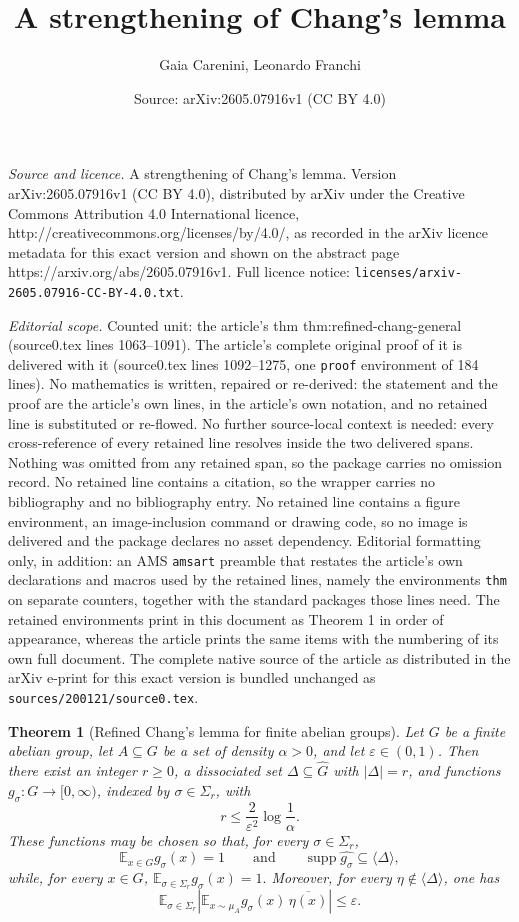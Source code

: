 \documentclass[10pt,a4paper]{amsart}
\title{A strengthening of Chang's lemma}
\author{Gaia Carenini, Leonardo Franchi}
\date{Source: arXiv:2605.07916v1 (CC BY 4.0)}
\newtheorem{thm}{Theorem}
\begin{document}
\maketitle

\noindent\emph{Source and licence.} A strengthening of Chang's lemma. Version arXiv:2605.07916v1 (CC BY 4.0), distributed by arXiv under the Creative Commons Attribution 4.0 International licence, http://creativecommons.org/licenses/by/4.0/, as recorded in the arXiv licence metadata for this exact version and shown on the abstract page https://arxiv.org/abs/2605.07916v1. Full licence notice: \texttt{licenses/arxiv-2605.07916-CC-BY-4.0.txt}.\par\smallskip

\noindent\textit{Editorial scope.} Counted unit: the article's thm thm:refined-chang-general (source0.tex lines 1063--1091). The article's complete original proof of it is delivered with it (source0.tex lines 1092--1275, one \texttt{proof} environment of 184 lines). No mathematics is written, repaired or re-derived: the statement and the proof are the article's own lines, in the article's own notation, and no retained line is substituted or re-flowed.  No further source-local context is needed: every cross-reference of every retained line resolves inside the two delivered spans.  Nothing was omitted from any retained span, so the package carries no omission record.  No retained line contains a citation, so the wrapper carries no bibliography and no bibliography entry.  No retained line contains a figure environment, an image-inclusion command or drawing code, so no image is delivered and the package declares no asset dependency.  Editorial formatting only, in addition: an AMS \texttt{amsart} preamble that restates the article's own declarations and macros used by the retained lines, namely the environments \texttt{thm} on separate counters, together with the standard packages those lines need.  The retained environments print in this document as Theorem 1 in order of appearance, whereas the article prints the same items with the numbering of its own full document.  The complete native source of the article as distributed in the arXiv e-print for this exact version is bundled unchanged as \texttt{sources/200121/source0.tex}.
\begin{thm}[Refined Chang's lemma for finite abelian groups]
\label{thm:refined-chang-general}
Let $G$ be a finite abelian group, let $A\subseteq G$ be a set of density
$\alpha>0$, and let $\varepsilon\in(0,1)$. Then there exist an integer
$r\ge 0$, a dissociated set $\Delta\subseteq \widehat G$ with $|\Delta|=r$,
and functions $g_\sigma:G\to[0,\infty)$, indexed by $\sigma\in\Sigma_r$,
with
$$
r\le \frac{2}{\varepsilon^2}\log\frac1\alpha.
$$
These functions may be chosen so that, for every $\sigma\in\Sigma_r$,
$$
\mathbb E_{x\in G} g_\sigma(x)=1
\qquad\text{and}\qquad
\operatorname{supp}\widehat{g_\sigma}\subseteq \langle\Delta\rangle,
$$
while, for every $x\in G$,
$
\mathbb E_{\sigma\in\Sigma_r} g_\sigma(x)=1.
$
Moreover, for every $\eta\notin\langle\Delta\rangle$, one has
$$
\mathbb E_{\sigma\in\Sigma_r}
\left|
\mathbb E_{x\sim\mu_A} g_\sigma(x)\,\overline{\eta(x)}
\right|
\le \varepsilon.
$$
\end{thm}
\end{document}
